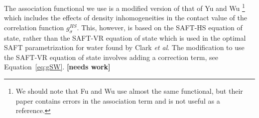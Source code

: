 \documentclass[letterpaper,twocolumn,amsmath,amssymb,prb]{revtex4-1}
\newcommand{\red}[1]{{\bf \color{red} #1}}
\newcommand{\fixme}[1]{\red{[#1]}}
\begin{document}
The association functional we use is a modified version of that of Yu
and Wu\cite{yu2002fmt-dft-inhomogeneous-associating} \footnote{We
  should note that Fu and Wu\cite{fu2005vapor-liquid-dft} use almost
  the same functional, but their paper contains errors in the
  association term and is not useful as a reference.} 
which includes the effects of density inhomogeneities in the
contact value of the correlation function $g^{HS}_\sigma$. This, however, is
based on the SAFT-HS equation of state, rather than the SAFT-VR
equation of state\cite{gil-villegas-1997-SAFT-VR} which is used in the
optimal SAFT parametrization for water found by Clark \emph{et
  al}\cite{clark2006developing}.  The modification to use the SAFT-VR
equation of state involves adding a correction term, see
Equation~\ref{eq:gSW}.  \fixme{needs work}
\end{document}
